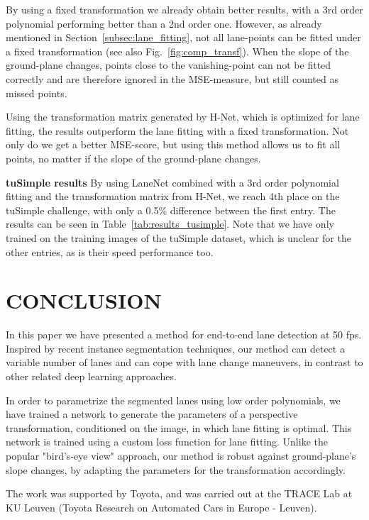 \documentclass[letterpaper, 10 pt, conference]{ieeeconf}
\begin{document}
By using a fixed transformation we already obtain better results, with a 3rd order polynomial performing better than a 2nd order one. However, as already mentioned in Section~\ref{subsec:lane_fitting}, not all lane-points can be fitted under a fixed transformation (see also Fig.~\ref{fig:comp_transf}). When the slope of the ground-plane changes, points close to the vanishing-point can not be fitted correctly and are therefore ignored in the MSE-measure, but still counted as missed points. 

Using the transformation matrix generated by H-Net, which is optimized for lane fitting, the results outperform the lane fitting with a fixed transformation. Not only do we get a better MSE-score, but using this method allows us to fit all points, no matter if the slope of the ground-plane changes.

\textbf{tuSimple results} By using LaneNet combined with a 3rd order polynomial fitting and the transformation matrix from H-Net, we reach 4th place on the tuSimple challenge, with only a 0.5\% difference between the first entry. The results can be seen in Table~\ref{tab:results_tusimple}. Note that we have only trained on the training images of the tuSimple dataset, which is unclear for the other entries, as is their speed performance too. 


\section{CONCLUSION}
\label{sec:conclusion}

In this paper we have presented a method for end-to-end lane detection at 50 fps. Inspired by recent instance segmentation techniques, our method can detect a variable number of lanes and can cope with lane change maneuvers, in contrast to other related deep learning approaches. 

In order to parametrize the segmented lanes using low order polynomials, we have trained a network to generate the parameters of a perspective transformation, conditioned on the image, in which lane fitting is optimal. This network is trained using a custom loss function for lane fitting. Unlike the popular "bird's-eye view" approach, our method is robust against ground-plane's slope changes, by adapting the parameters for the transformation accordingly.

 The work was supported by Toyota, and was carried out at the TRACE Lab at KU Leuven (Toyota Research on Automated Cars in Europe - Leuven).
\end{document}
